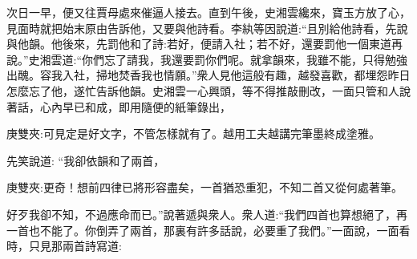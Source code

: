 \begin{parag}
    次日一早，便又往賈母處來催逼人接去。直到午後，史湘雲纔來，寶玉方放了心，見面時就把始末原由告訴他，又要與他詩看。李紈等因說道:“且別給他詩看，先說與他韻。他後來，先罰他和了詩:若好，便請入社；若不好，還要罰他一個東道再說。”史湘雲道:“你們忘了請我，我還要罰你們呢。就拿韻來，我雖不能，只得勉強出醜。容我入社，掃地焚香我也情願。”衆人見他這般有趣，越發喜歡，都埋怨昨日怎麼忘了他，遂忙告訴他韻。史湘雲一心興頭，等不得推敲刪改，一面只管和人說著話，心內早已和成，即用隨便的紙筆錄出，\begin{note}庚雙夾:可見定是好文字，不管怎樣就有了。越用工夫越講完筆墨終成塗雅。\end{note}先笑說道: “我卻依韻和了兩首，\begin{note}庚雙夾:更奇！想前四律已將形容盡矣，一首猶恐重犯，不知二首又從何處著筆。\end{note}好歹我卻不知，不過應命而已。”說著遞與衆人。衆人道:“我們四首也算想絕了，再一首也不能了。你倒弄了兩首，那裏有許多話說，必要重了我們。”一面說，一面看時，只見那兩首詩寫道:
\end{parag}



